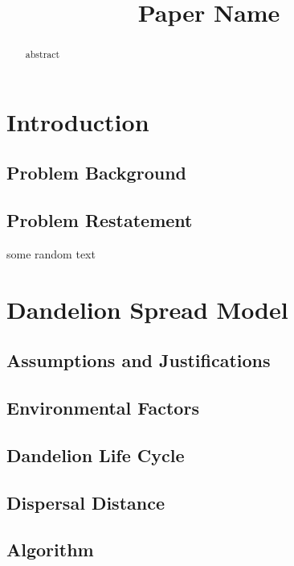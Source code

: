 \documentclass[12pt]{article}
\title{Paper Name}  %
\begin{document}
\begin{abstract}

	abstract

\end{abstract}

\maketitle
\tableofcontents





\section{Introduction}

	\subsection{Problem Background}
	
	\subsection{Problem Restatement}
	
	some random text

\section{Dandelion Spread Model}

	\subsection{Assumptions and Justifications}
	
	\subsection{Environmental Factors}
	
	\subsection{Dandelion Life Cycle}
	
	\subsection{Dispersal Distance}
	
	\subsection{Algorithm}
	
\end{document}

